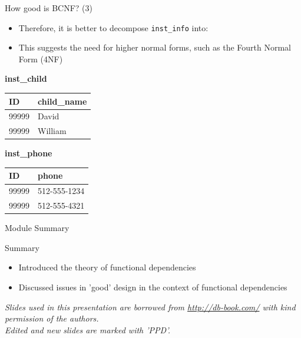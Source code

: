 \documentclass[aspectratio=169, xcolor=dvipsnames]{beamer}
\begin{document}
\begin{frame}{How good is BCNF? (3)}
    \begin{itemize}[<+->]
        \item Therefore, it is better to decompose \texttt{inst\_info} into:
        \item This suggests the need for higher normal forms, such as the Fourth Normal Form (4NF)
    \end{itemize}
    \begin{center}
    \textbf{inst\_child} \\
    \begin{tabular}{|l|l|}
    \hline
    \textbf{ID} & \textbf{child\_name} \\ \hline
    99999 & David \\ 
    99999 & William \\ \hline
    \end{tabular}
    \qquad
    \textbf{inst\_phone} \\
    \begin{tabular}{|l|l|}
    \hline
    \textbf{ID} & \textbf{phone} \\ \hline
    99999 & 512-555-1234 \\ 
    99999 & 512-555-4321 \\ \hline
    \end{tabular}
    \end{center}
\end{frame}

\begin{frame}{Module Summary}
    \begin{block}{Summary}
        \begin{itemize}[<+->]
            \item Introduced the theory of functional dependencies
            \item Discussed issues in 'good' design in the context of functional dependencies
        \end{itemize}
    \end{block}
    \vspace{2em}
    \begin{center}
    \small \textit{Slides used in this presentation are borrowed from \url{http://db-book.com/} with kind permission of the authors.} \\
    \small \textit{Edited and new slides are marked with 'PPD'.}
    \end{center}
\end{frame}
\end{document}
